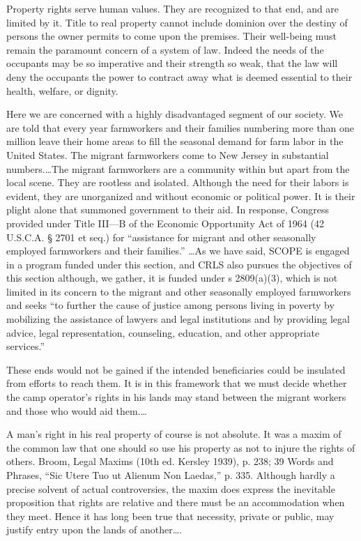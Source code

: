 
Property rights serve human values. They are recognized to that end, and are
limited by it. Title to real property cannot include dominion over the destiny
of persons the owner permits to come upon the premises. Their well-being must
remain the paramount concern of a system of law. Indeed the needs of the
occupants may be so imperative and their strength so weak, that the law will
deny the occupants the power to contract away what is deemed essential to their
health, welfare, or dignity.

Here we are concerned with a highly disadvantaged segment of our society. We are
told that every year farmworkers and their families numbering more than one
million leave their home areas to fill the seasonal demand for farm labor in
the United States. The migrant farmworkers come to New Jersey in substantial
numbers.\ldots The migrant farmworkers are a community within but apart from
the local scene. They are rootless and isolated. Although the need for their
labors is evident, they are unorganized and without economic or political
power. It is their plight alone that summoned government to their aid. In
response, Congress provided under Title III---B of the Economic Opportunity Act
of 1964 (42 U.S.C.A. {\S} 2701 et seq.) for ``assistance for migrant and other
seasonally employed farmworkers and their families.'' \ldots As we have said,
SCOPE is engaged in a program funded under this section, and CRLS also pursues
the objectives of this section although, we gather, it is funded under s
2809(a)(3), which is not limited in its concern to the migrant and other
seasonally employed farmworkers and seeks ``to further the cause of justice
among persons living in poverty by mobilizing the assistance of lawyers and
legal institutions and by providing legal advice, legal representation,
counseling, education, and other appropriate services.''

These ends would not be gained if the intended beneficiaries could be insulated
from efforts to reach them. It is in this framework that we must decide whether
the camp operator's rights in his lands may stand between the migrant workers
and those who would aid them.\ldots

A man's right in his real property of course is not absolute. It was a maxim of
the common law that one should so use his property as not to injure the rights
of others. Broom, Legal Maxims (10th ed. Kersley 1939), p. 238; 39 Words and
Phrases, ``Sic Utere Tuo ut Alienum Non Laedas,'' p. 335. Although hardly a
precise solvent of actual controversies, the maxim does express the inevitable
proposition that rights are relative and there must be an accommodation when
they meet. Hence it has long been true that necessity, private or public, may
justify entry upon the lands of another\ldots.

